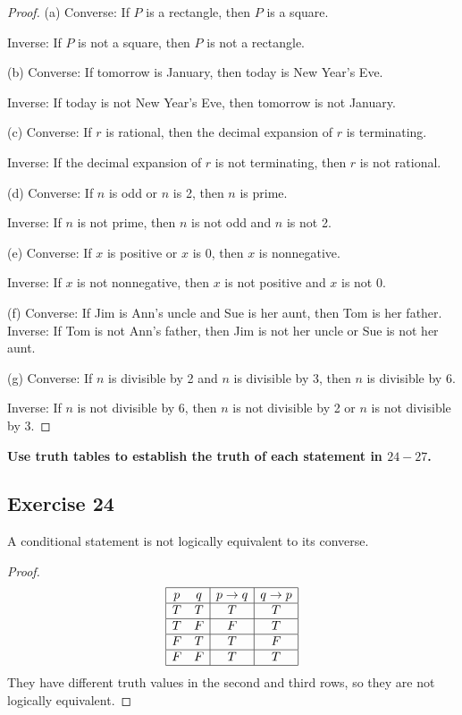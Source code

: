 \documentclass[14pt]{extarticle}
\begin{document}
\begin{proof}
(a) Converse: If $P$ is a rectangle, then $P$ is a square.

Inverse: If $P$ is not a square, then $P$ is not a rectangle.

(b) Converse: If tomorrow is January, then today is New Year’s Eve.

Inverse: If today is not New Year’s Eve, then tomorrow is not January.

(c) Converse: If $r$ is rational, then the decimal expansion of $r$ is
terminating.

Inverse: If the decimal expansion of $r$ is not terminating, then $r$ is not
rational.

(d) Converse: If $n$ is odd or $n$ is 2, then $n$ is prime.

Inverse: If $n$ is not prime, then $n$ is not odd and $n$ is not 2.	

(e) Converse: If $x$ is positive or $x$ is 0, then $x$ is nonnegative.

Inverse: If $x$ is not nonnegative, then $x$ is not positive and $x$ is not 0.

(f) Converse: If Jim is Ann’s uncle and Sue is her aunt, then Tom is her father.
Inverse: If Tom is not Ann’s father, then Jim is not her uncle or Sue is not her
aunt.

(g) Converse: If $n$ is divisible by 2 and $n$ is divisible by 3, then $n$ is
divisible by 6.

Inverse: If $n$ is not divisible by 6, then $n$ is not divisible by 2 or $n$ is
not divisible by 3.
\end{proof}

{\bf Use truth tables to establish the truth of each statement
in $24-27$.}

\subsection{Exercise 24}
A conditional statement is not logically equivalent to its converse.

\begin{proof}
$$
\begin{array}{|cc|c|c|}
\hline
p & q & p \to q & q \to p \\
\hline
T & T & T & T \\
\hline
T & F & F & T \\
\hline
F & T & T & F \\
\hline
F & F & T & T \\
\hline
\end{array}
$$
They have different truth values in the second and third rows, so they are not
logically equivalent.
\end{proof}
\end{document}
